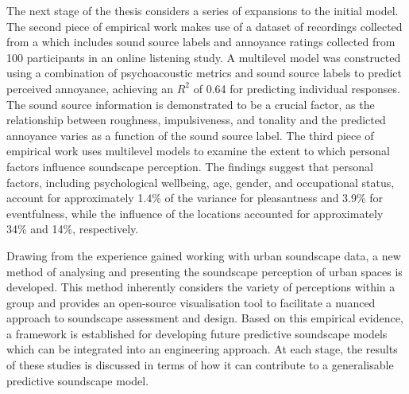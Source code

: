 \documentclass[oneside,fontsize=11pt,titlepage,chapterprefix=true
]{scrbook}
\newcommand{\remark}[3]{%
    {\colorbox{#2}{\sffamily\scriptsize\bfseries\textcolor{white}{#1}}}
    {\sffamily\small\itshape\textcolor{#2}{#3}}
}
\newcommand{\draft}[1]{\remark{draft}{blue}{#1}}
\begin{document}
The next stage of the thesis considers a series of expansions to the initial model. The second piece of empirical work makes use of a dataset of recordings collected from a  which includes sound source labels and annoyance ratings collected from 100 participants in an online listening study. A multilevel model was constructed using a combination of psychoacoustic metrics and sound source labels to predict perceived annoyance, achieving an $R^2$ of 0.64 for predicting individual responses. The sound source information is demonstrated to be a crucial factor, as the relationship between roughness, impulsiveness, and tonality and the predicted annoyance varies as a function of the sound source label. The third piece of empirical work uses multilevel models to examine the extent to which personal factors influence soundscape perception. The findings suggest that personal factors, including psychological wellbeing, age, gender, and occupational status, account for approximately 1.4\% of the variance for pleasantness and 3.9\% for eventfulness, while the influence of the locations accounted for approximately 34\% and 14\%, respectively. 

Drawing from the experience gained working with urban soundscape data, a new method of analysing and presenting the soundscape perception of urban spaces is developed. This method inherently considers the variety of perceptions within a group and provides an open-source visualisation tool to facilitate a nuanced approach to soundscape assessment and design. Based on this empirical evidence, a framework is established for developing future predictive soundscape models which can be integrated into an engineering approach. At each stage, the results of these studies is discussed in terms of how it can contribute to a generalisable predictive soundscape model. 




\end{document}
